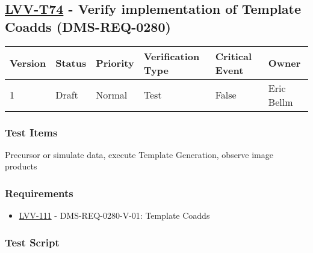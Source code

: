 \hypertarget{lvv-t74---verify-implementation-of-template-coadds-dms-req-0280}{%
\subsection{\texorpdfstring{\href{https://jira.lsstcorp.org/secure/Tests.jspa\#/testCase/LVV-T74}{LVV-T74}
- Verify implementation of Template Coadds
(DMS-REQ-0280)}{LVV-T74 - Verify implementation of Template Coadds (DMS-REQ-0280)}}\label{lvv-t74---verify-implementation-of-template-coadds-dms-req-0280}}

\begin{longtable}[]{@{}llllll@{}}
\toprule
Version & Status & Priority & Verification Type & Critical Event &
Owner\tabularnewline
\midrule
\endhead
1 & Draft & Normal & Test & False & Eric Bellm\tabularnewline
\bottomrule
\end{longtable}

\hypertarget{test-items-50}{%
\subsubsection{Test Items}\label{test-items-50}}

Precursor or simulate data, execute Template Generation, observe image
products

\hypertarget{requirements-51}{%
\subsubsection{Requirements}\label{requirements-51}}

\begin{itemize}
\tightlist
\item
  \href{https://jira.lsstcorp.org/browse/LVV-111}{LVV-111} -
  DMS-REQ-0280-V-01: Template Coadds
\end{itemize}

\hypertarget{test-script-51}{%
\subsubsection{Test Script}\label{test-script-51}}

